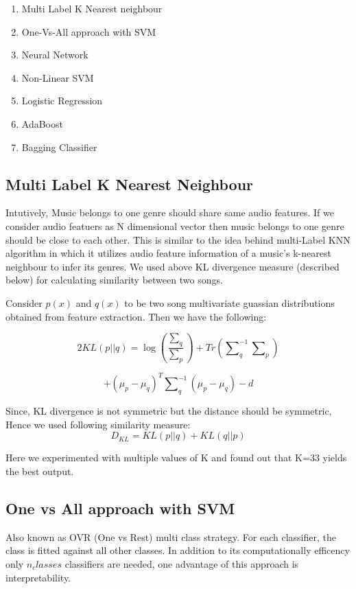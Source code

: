 \documentclass[conference]{IEEEtran}
\begin{document}
\begin{enumerate}
  \item Multi Label K Nearest neighbour
  \item One-Vs-All approach with SVM
  \item Neural Network
  \item Non-Linear SVM
  \item Logistic Regression
  \item AdaBoost
  \item Bagging Classifier
\end{enumerate}


\subsection{Multi Label K Nearest Neighbour}
\label{sub:Multi Label K Nearest Neighbour}

Intutively, Music belongs to one genre should share same audio features. If we consider audio featuers as N dimensional vector then music belongs to one genre should be close to each other. This is similar to the idea behind multi-Label KNN algorithm in which it utilizes audio feature information of a music's k-nearest neighbour to infer its genres. We used above KL divergence measure (described below) for calculating similarity between two songs.

Consider $ p(x) $ and $ q(x) $ to be two song multivariate guassian distributions obtained from feature extraction. Then we have the following:

$$ 2KL(p||q) = \log{\left(\frac{\sum\nolimits_q}{\sum\nolimits_p}\right)} + Tr\left(\sum\nolimits_q^{-1}\sum\nolimits_p\right) $$

$$    + {\left(\mu_p - \mu_q\right)}^{T}\sum\nolimits_q^{-1}(\mu_p - \mu_q) - d $$


Since, KL divergence is not symmetric but the distance should be symmetric, Hence we used following similarity measure:
$$ {D}_{KL} =  KL\left(p||q\right) + KL\left(q||p\right) $$

Here we experimented with multiple values of K and found out that K=33 yields the best output.

\subsection{One vs All approach with SVM}
\label{sub:One vs All approach with SVM}

Also known as OVR (One vs Rest) multi class strategy. For each classifier, the class is fitted against all other classes. In addition to its computationally efficency only $n_classes$ classifiers are needed, one advantage of this approach is interpretability.
\end{document}

